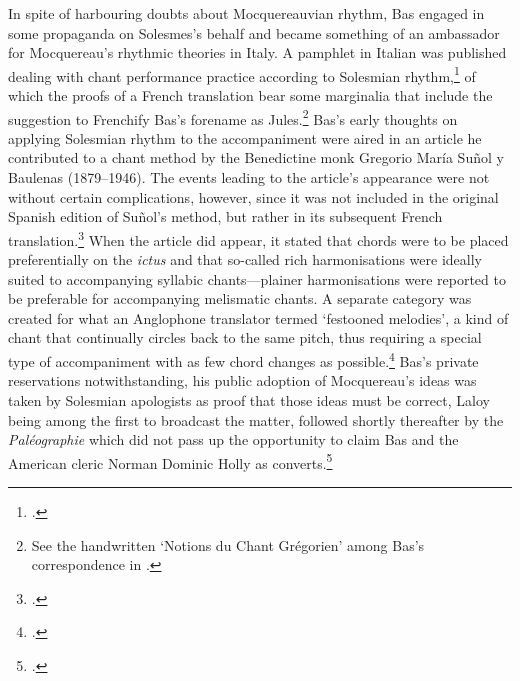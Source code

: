 In spite of harbouring doubts about Mocquereauvian rhythm, Bas engaged in some propaganda on Solesmes's behalf and became something of an ambassador for Mocquereau's rhythmic theories in Italy.
A pamphlet in Italian was published dealing with chant performance practice according to Solesmian rhythm,\footnote{\covid{}\cite{BasNozionidicanto1904}.} of which the proofs of a French translation bear some marginalia that include the suggestion to Frenchify Bas's forename as Jules.\footnote{See the handwritten `Notions du Chant Grégorien' among Bas's correspondence in \so{}.}
Bas's early thoughts on applying Solesmian rhythm to the accompaniment were aired in an article he contributed to a chant method by the Benedictine monk Gregorio María Suñol y Baulenas (1879--1946).
The events leading to the article's appearance were not without certain complications, however, since it was not included in the original Spanish edition of Suñol's method, but rather in its subsequent French translation.\footcite[Note the absence of Bas's contribution in][195--7]{SunolMetodocompletosolfeo1905}
%
When the article did appear, it stated that chords were to be placed preferentially on the \emph{ictus} and that so-called rich harmonisations were ideally suited to accompanying syllabic chants---plainer harmonisations were reported to be preferable for accompanying melismatic chants.
%
A separate category was created for what an Anglophone translator termed `festooned melodies', a kind of chant that continually circles back to the same pitch, thus requiring a special type of accompaniment with as few chord changes as possible.\footcite[pp.~153, 158--60]{SunolTextBookGregorian1930}
Bas's private reservations notwithstanding, his public adoption of Mocquereau's ideas was taken by Solesmian apologists as proof that those ideas must be correct, Laloy being among the first to broadcast the matter, followed shortly thereafter by the \emph{Paléographie} which did not pass up the opportunity to claim Bas and the American cleric Norman Dominic Holly as converts.\footcites[547--8]{LaloyQuelquesmotsrythme1903}[7:154--7]{MocquereauPaleographiemusicale1901}

